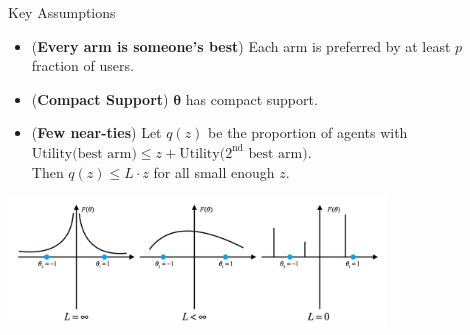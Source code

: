 \documentclass[serif]{beamer}
\begin{document}
\begin{frame}{Key Assumptions}
\begin{itemize}
\item (\textbf{Every arm is someone's best}) Each arm is preferred by at least $p$ fraction of users.
\vspace{0.2cm}
\item (\textbf{Compact Support}) $\bm{\theta}$ has compact support.
\vspace{0.2cm}
\item (\textbf{Few near-ties}) 
Let $q(z)$ be the proportion of agents with
$\text{Utility(best arm)} \le z + \text{Utility($2^{\mathrm{nd}}$ best arm)}$.\\
Then $q(z)\leq L\cdot z$ for all small enough $z$.
\end{itemize}
\begin{center}
\includegraphics[width=10cm]{example3}
\end{center}
\end{frame}
\end{document}
